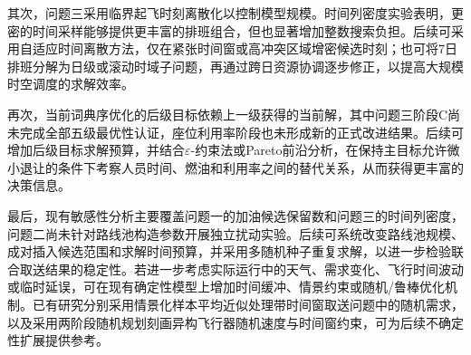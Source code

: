 其次，问题三采用临界起飞时刻离散化以控制模型规模。时间列密度实验表明，更密的时间采样能够提供更丰富的排班组合，但也显著增加整数搜索负担。后续可采用自适应时间离散方法，仅在紧张时间窗或高冲突区域增密候选时刻；也可将7日排班分解为日级或滚动时域子问题，再通过跨日资源协调逐步修正，以提高大规模时空调度的求解效率。

再次，当前词典序优化的后级目标依赖上一级获得的当前解，其中问题三阶段C尚未完成全部五级最优性认证，座位利用率阶段也未形成新的正式改进结果。后续可增加后级目标求解预算，并结合$\varepsilon$-约束法或Pareto前沿分析，在保持主目标允许微小退让的条件下考察人员时间、燃油和利用率之间的替代关系，从而获得更丰富的决策信息。

最后，现有敏感性分析主要覆盖问题一的加油候选保留数和问题三的时间列密度，问题二尚未针对路线池构造参数开展独立扰动实验。后续可系统改变路线池规模、成对插入候选范围和求解时间预算，并采用多随机种子重复求解，以进一步检验联合取送结果的稳定性。若进一步考虑实际运行中的天气、需求变化、飞行时间波动或临时延误，可在现有确定性模型上增加时间缓冲、情景约束或随机/鲁棒优化机制。已有研究分别采用情景化样本平均近似处理带时间窗取送问题中的随机需求\cite{ghilas2016stochastic}，以及采用两阶段随机规划刻画异构飞行器随机速度与时间窗约束\cite{jia2018}，可为后续不确定性扩展提供参考。
